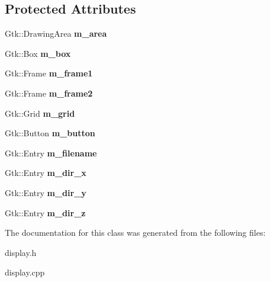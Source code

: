 \subsection*{Protected Attributes}
\begin{DoxyCompactItemize}
\item 
Gtk\+::\+Drawing\+Area {\bfseries m\+\_\+area}\hypertarget{classInput3dWindow_af4d22c728a235c13ef4a04709fcc3816}{}\label{classInput3dWindow_af4d22c728a235c13ef4a04709fcc3816}

\item 
Gtk\+::\+Box {\bfseries m\+\_\+box}\hypertarget{classInput3dWindow_a0b423e90d828a9ea2da836ae35daac37}{}\label{classInput3dWindow_a0b423e90d828a9ea2da836ae35daac37}

\item 
Gtk\+::\+Frame {\bfseries m\+\_\+frame1}\hypertarget{classInput3dWindow_a97b40510a0bd72ee8af7b97c3a8f0d76}{}\label{classInput3dWindow_a97b40510a0bd72ee8af7b97c3a8f0d76}

\item 
Gtk\+::\+Frame {\bfseries m\+\_\+frame2}\hypertarget{classInput3dWindow_a9b3c1a5603a9698638bbad2b9dfa270c}{}\label{classInput3dWindow_a9b3c1a5603a9698638bbad2b9dfa270c}

\item 
Gtk\+::\+Grid {\bfseries m\+\_\+grid}\hypertarget{classInput3dWindow_a00986d39a095c6d9fe231479965a4140}{}\label{classInput3dWindow_a00986d39a095c6d9fe231479965a4140}

\item 
Gtk\+::\+Button {\bfseries m\+\_\+button}\hypertarget{classInput3dWindow_a19b7bb9679cb057ddeed6709e0e80b22}{}\label{classInput3dWindow_a19b7bb9679cb057ddeed6709e0e80b22}

\item 
Gtk\+::\+Entry {\bfseries m\+\_\+filename}\hypertarget{classInput3dWindow_a238d6ef3aedc09602e24490a5eaa6ef7}{}\label{classInput3dWindow_a238d6ef3aedc09602e24490a5eaa6ef7}

\item 
Gtk\+::\+Entry {\bfseries m\+\_\+dir\+\_\+x}\hypertarget{classInput3dWindow_a12a865878cfbfc3bc4330f535dc17ce8}{}\label{classInput3dWindow_a12a865878cfbfc3bc4330f535dc17ce8}

\item 
Gtk\+::\+Entry {\bfseries m\+\_\+dir\+\_\+y}\hypertarget{classInput3dWindow_ab23381bd2cb6e05f80fad025a76aab29}{}\label{classInput3dWindow_ab23381bd2cb6e05f80fad025a76aab29}

\item 
Gtk\+::\+Entry {\bfseries m\+\_\+dir\+\_\+z}\hypertarget{classInput3dWindow_af2ba744e58fa7bad1ddbb98b5bfaad4f}{}\label{classInput3dWindow_af2ba744e58fa7bad1ddbb98b5bfaad4f}

\end{DoxyCompactItemize}


The documentation for this class was generated from the following files\+:\begin{DoxyCompactItemize}
\item 
display.\+h\item 
display.\+cpp\end{DoxyCompactItemize}
